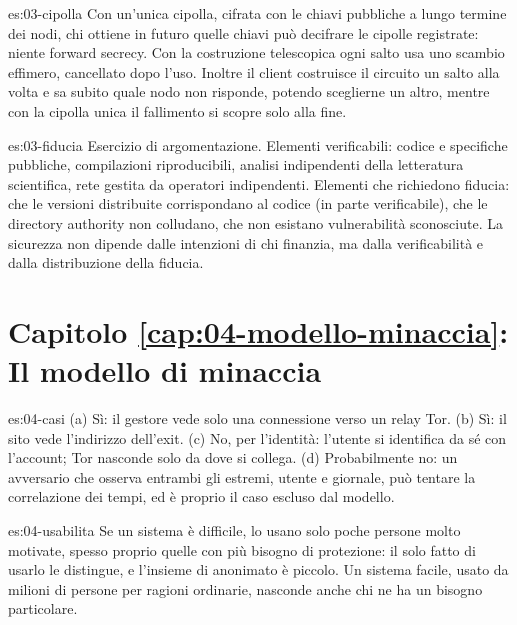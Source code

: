 \begin{soluzione}{es:03-cipolla}
Con un'unica cipolla, cifrata con le chiavi pubbliche a lungo termine dei nodi, chi ottiene in futuro quelle chiavi può decifrare le cipolle registrate: niente forward secrecy. Con la costruzione telescopica ogni salto usa uno scambio effimero, cancellato dopo l'uso. Inoltre il client costruisce il circuito un salto alla volta e sa subito quale nodo non risponde, potendo sceglierne un altro, mentre con la cipolla unica il fallimento si scopre solo alla fine.
\end{soluzione}

\begin{soluzione}{es:03-fiducia}
Esercizio di argomentazione. Elementi verificabili: codice e specifiche pubbliche, compilazioni riproducibili, analisi indipendenti della letteratura scientifica, rete gestita da operatori indipendenti. Elementi che richiedono fiducia: che le versioni distribuite corrispondano al codice (in parte verificabile), che le directory authority non colludano, che non esistano vulnerabilità sconosciute. La sicurezza non dipende dalle intenzioni di chi finanzia, ma dalla verificabilità e dalla distribuzione della fiducia.
\end{soluzione}

\section*{Capitolo \ref{cap:04-modello-minaccia}: Il modello di minaccia}

\begin{soluzione}{es:04-casi}
(a) Sì: il gestore vede solo una connessione verso un relay Tor. (b) Sì: il sito vede l'indirizzo dell'exit. (c) No, per l'identità: l'utente si identifica da sé con l'account; Tor nasconde solo da dove si collega. (d) Probabilmente no: un avversario che osserva entrambi gli estremi, utente e giornale, può tentare la correlazione dei tempi, ed è proprio il caso escluso dal modello.
\end{soluzione}

\begin{soluzione}{es:04-usabilita}
Se un sistema è difficile, lo usano solo poche persone molto motivate, spesso proprio quelle con più bisogno di protezione: il solo fatto di usarlo le distingue, e l'insieme di anonimato è piccolo. Un sistema facile, usato da milioni di persone per ragioni ordinarie, nasconde anche chi ne ha un bisogno particolare.
\end{soluzione}

